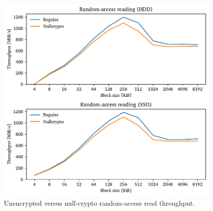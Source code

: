 \begin{figure}[htb!]
	\center
	\includegraphics[scale=1]{../fig/performance.results.nullcryptorand.pdf}
	\caption[
		Unencrypted versus null-crypto random-access read throughput
	]{
		Unencrypted versus null-crypto random-access read throughput. 
	}
	\label{fig:performance.results.nullcryptorand}
\end{figure}

